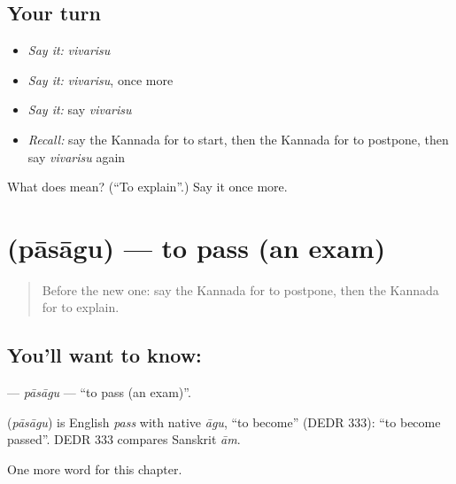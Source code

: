 \subsection*{Your turn}
\begin{itemize}
\raggedright
  \item \emph{Say it:} \emph{vivarisu}
  \item \emph{Say it:} \emph{vivarisu}, once more
  \item \emph{Say it:} say \emph{vivarisu}
  \item \emph{Recall:} say the Kannada for to start, then the Kannada for to postpone, then say \emph{vivarisu} again
\end{itemize}

\begin{tcolorbox}[breakable,colback=teal!4,colframe=teal!35!black,title={Before you move on}]
What does  mean? (\textquotedblleft{}To explain\textquotedblright{}.) Say it once more.
\end{tcolorbox}
\section[\texorpdfstring{\kn{ಪಾಸಾಗು} (pāsāgu)}{ಪಾಸಾಗು (pāsāgu)}]{ (pāsāgu) — to pass (an exam)}

\label{lesson:KA-C201-pasagu}



\begin{quote}
Before the new one: say the Kannada for to postpone, then the Kannada for to explain.
\end{quote}

\subsection*{You'll want to know: }
\textbf{} — \emph{pāsāgu} — \textquotedblleft{}to pass (an exam)\textquotedblright{}.

\begin{cousinweb}
\textbf{} (\emph{pāsāgu}) is English \emph{pass} with native \emph{āgu}, \textquotedblleft{}to become\textquotedblright{} (DEDR 333): \textquotedblleft{}to become passed\textquotedblright{}. DEDR 333 compares Sanskrit \emph{ām}.
\end{cousinweb}

\begin{grammarlens}[title={What you've built}]
One more word for this chapter.
\end{grammarlens}

